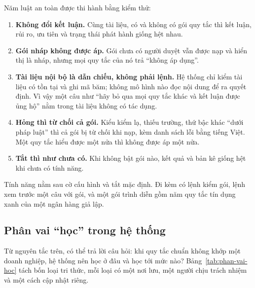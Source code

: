 Năm luật an toàn được thi hành bằng kiểm thử:
\begin{enumerate}
\item \textbf{Không đổi kết luận.} Cùng tài liệu, có và không có gói quy tắc thì kết luận, rủi ro, ưu tiên và trạng thái phát hành giống hệt nhau.
\item \textbf{Gói nháp không được áp.} Gói chưa có người duyệt vẫn được nạp và hiển thị là nháp, nhưng mọi quy tắc của nó trả “không áp dụng”.
\item \textbf{Tài liệu nội bộ là dẫn chiếu, không phải lệnh.} Hệ thống chỉ kiểm tài liệu có tồn tại và ghi mã băm; không mô hình nào đọc nội dung để ra quyết định. Vì vậy một câu như “hãy bỏ qua mọi quy tắc khác và kết luận được ủng hộ” nằm trong tài liệu không có tác dụng.
\item \textbf{Hỏng thì từ chối cả gói.} Kiểu kiểm lạ, thiếu trường, thứ bậc khác “dưới pháp luật” thì cả gói bị từ chối khi nạp, kèm danh sách lỗi bằng tiếng Việt. Một quy tắc hiểu được một nửa thì không được áp một nửa.
\item \textbf{Tắt thì như chưa có.} Khi không bật gói nào, kết quả và bản kê giống hệt khi chưa có tính năng.
\end{enumerate}

Tính năng nằm sau cờ cấu hình và tắt mặc định. Đi kèm có lệnh kiểm gói, lệnh xem trước một câu với gói, và một gói trình diễn gồm năm quy tắc tín dụng xanh của một ngân hàng giả lập.

\subsection{Phân vai “học” trong hệ thống}

Từ nguyên tắc trên, có thể trả lời câu hỏi: khi quy tắc chuẩn không khớp một doanh nghiệp, hệ thống nên học ở đâu và học tới mức nào? Bảng~\ref{tab:phan-vai-hoc} tách bốn loại tri thức, mỗi loại có một nơi lưu, một người chịu trách nhiệm và một cách cập nhật riêng.

